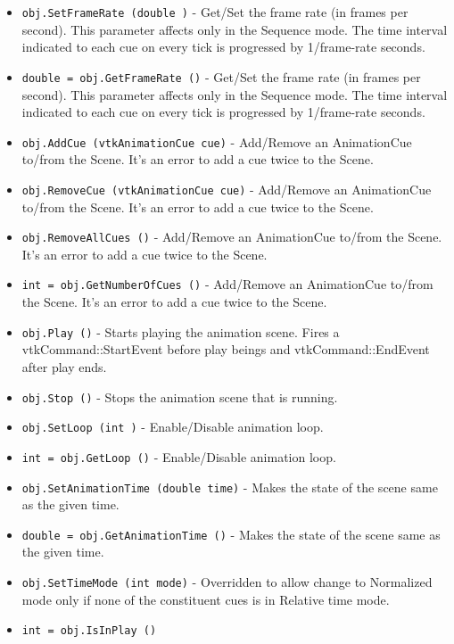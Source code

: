 \begin{itemize}
\item  \verb|obj.SetFrameRate (double )| -  Get/Set the frame rate (in frames per second).
 This parameter affects only in the Sequence mode. The time interval
 indicated to each cue on every tick is progressed by 1/frame-rate seconds.

\item  \verb|double = obj.GetFrameRate ()| -  Get/Set the frame rate (in frames per second).
 This parameter affects only in the Sequence mode. The time interval
 indicated to each cue on every tick is progressed by 1/frame-rate seconds.

\item  \verb|obj.AddCue (vtkAnimationCue cue)| -  Add/Remove an AnimationCue to/from the Scene.
 It's an error to add a cue twice to the Scene.

\item  \verb|obj.RemoveCue (vtkAnimationCue cue)| -  Add/Remove an AnimationCue to/from the Scene.
 It's an error to add a cue twice to the Scene.

\item  \verb|obj.RemoveAllCues ()| -  Add/Remove an AnimationCue to/from the Scene.
 It's an error to add a cue twice to the Scene.

\item  \verb|int = obj.GetNumberOfCues ()| -  Add/Remove an AnimationCue to/from the Scene.
 It's an error to add a cue twice to the Scene.

\item  \verb|obj.Play ()| -  Starts playing the animation scene. Fires a vtkCommand::StartEvent
 before play beings and vtkCommand::EndEvent after play ends.

\item  \verb|obj.Stop ()| -  Stops the animation scene that is running.

\item  \verb|obj.SetLoop (int )| -  Enable/Disable animation loop.

\item  \verb|int = obj.GetLoop ()| -  Enable/Disable animation loop.

\item  \verb|obj.SetAnimationTime (double time)| -  Makes the state of the scene same as the given time.

\item  \verb|double = obj.GetAnimationTime ()| -  Makes the state of the scene same as the given time.

\item  \verb|obj.SetTimeMode (int mode)| -  Overridden to allow change to Normalized mode only
 if none of the constituent cues is in Relative time mode.

\item  \verb|int = obj.IsInPlay ()|

\end{itemize}
